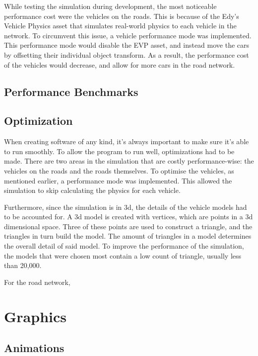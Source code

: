     While testing the simulation during development, the most noticeable performance cost were the vehicles on the roads. This is because of the Edy's Vehicle Physics asset that simulates real-world physics to each vehicle in the network. To circumvent this issue, a vehicle performance mode was implemented. This performance mode would disable the EVP asset, and instead move the cars by offsetting their individual object transform. As a result, the performance cost of the vehicles would decrease, and allow for more cars in the road network.




\subsection{Performance Benchmarks}

\subsection{Optimization} 
    When creating software of any kind, it's always important to make sure it's able to run smoothly. To allow the program to run well, optimizations had to be made. There are two areas in the simulation that are costly performance-wise: the vehicles on the roads and the roads themselves. To optimise the vehicles, as mentioned earlier, a performance mode was implemented. This allowed the simulation to skip calculating the physics for each vehicle. 

    Furthermore, since the simulation is in 3d, the details of the vehicle models had to be accounted for. A 3d model is created with vertices, which are points in a 3d dimensional space. Three of these points are used to construct a triangle, and the triangles in turn build the model. The amount of triangles in a model determines the overall detail of said model. To improve the performance of the simulation, the models that were chosen most contain a low count of triangle, usually less than 20,000. 

    For the road network, %

\section{Graphics}

\subsection{Animations}

